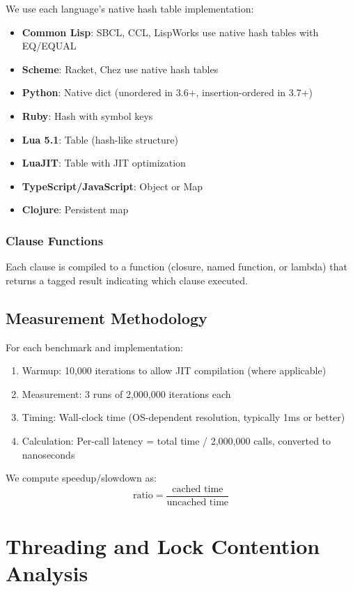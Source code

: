 \documentclass[sigplan,final]{acmart}
\begin{document}
We use each language's native hash table implementation:
\begin{itemize}
  \item \textbf{Common Lisp}: SBCL, CCL, LispWorks use native hash tables with EQ/EQUAL
  \item \textbf{Scheme}: Racket, Chez use native hash tables
  \item \textbf{Python}: Native dict (unordered in 3.6+, insertion-ordered in 3.7+)
  \item \textbf{Ruby}: Hash with symbol keys
  \item \textbf{Lua 5.1}: Table (hash-like structure)
  \item \textbf{LuaJIT}: Table with JIT optimization
  \item \textbf{TypeScript/JavaScript}: Object or Map
  \item \textbf{Clojure}: Persistent map
\end{itemize}

\subsubsection{Clause Functions}

Each clause is compiled to a function (closure, named function, or lambda) that returns a
tagged result indicating which clause executed.

\subsection{Measurement Methodology}

For each benchmark and implementation:
\begin{enumerate}
  \item Warmup: 10,000 iterations to allow JIT compilation (where applicable)
  \item Measurement: 3 runs of 2,000,000 iterations each
  \item Timing: Wall-clock time (OS-dependent resolution, typically 1ms or better)
  \item Calculation: Per-call latency = total time / 2,000,000 calls, converted to nanoseconds
\end{enumerate}

We compute speedup/slowdown as:
\[
\text{ratio} = \frac{\text{cached time}}{\text{uncached time}}
\]

\section{Threading and Lock Contention Analysis}
\label{sec:threading}
\end{document}
